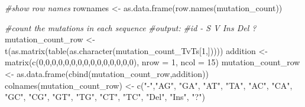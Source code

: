 \documentclass[
]{article}
\newenvironment{Shaded}{\begin{snugshade}}{\end{snugshade}}
\newcommand{\AttributeTok}[1]{\textcolor[rgb]{0.77,0.63,0.00}{#1}}
\newcommand{\CommentTok}[1]{\textcolor[rgb]{0.56,0.35,0.01}{\textit{#1}}}
\newcommand{\DecValTok}[1]{\textcolor[rgb]{0.00,0.00,0.81}{#1}}
\newcommand{\FunctionTok}[1]{\textcolor[rgb]{0.00,0.00,0.00}{#1}}
\newcommand{\NormalTok}[1]{#1}
\newcommand{\OtherTok}[1]{\textcolor[rgb]{0.56,0.35,0.01}{#1}}
\newcommand{\StringTok}[1]{\textcolor[rgb]{0.31,0.60,0.02}{#1}}
\begin{document}
\begin{Shaded}
\begin{Highlighting}[]
\CommentTok{\#show row names}
\NormalTok{rownames }\OtherTok{\textless{}{-}} \FunctionTok{as.data.frame}\NormalTok{(}\FunctionTok{row.names}\NormalTok{(mutation\_count))}

\CommentTok{\#count the mutations in each sequence}
\CommentTok{\#output: }
\CommentTok{\#id {-} S V Ins Del ?}
\NormalTok{mutation\_count\_row }\OtherTok{\textless{}{-}} \FunctionTok{t}\NormalTok{(}\FunctionTok{as.matrix}\NormalTok{(}\FunctionTok{table}\NormalTok{(}\FunctionTok{as.character}\NormalTok{(mutation\_count\_TvTs[}\DecValTok{1}\NormalTok{,]))))}
\NormalTok{addition }\OtherTok{\textless{}{-}} \FunctionTok{matrix}\NormalTok{(}\FunctionTok{c}\NormalTok{(}\DecValTok{0}\NormalTok{,}\DecValTok{0}\NormalTok{,}\DecValTok{0}\NormalTok{,}\DecValTok{0}\NormalTok{,}\DecValTok{0}\NormalTok{,}\DecValTok{0}\NormalTok{,}\DecValTok{0}\NormalTok{,}\DecValTok{0}\NormalTok{,}\DecValTok{0}\NormalTok{,}\DecValTok{0}\NormalTok{,}\DecValTok{0}\NormalTok{,}\DecValTok{0}\NormalTok{,}\DecValTok{0}\NormalTok{,}\DecValTok{0}\NormalTok{,}\DecValTok{0}\NormalTok{), }\AttributeTok{nrow =} \DecValTok{1}\NormalTok{, }\AttributeTok{ncol =} \DecValTok{15}\NormalTok{)}
\NormalTok{mutation\_count\_row }\OtherTok{\textless{}{-}} \FunctionTok{as.data.frame}\NormalTok{(}\FunctionTok{cbind}\NormalTok{(mutation\_count\_row,addition))}
\FunctionTok{colnames}\NormalTok{(mutation\_count\_row) }\OtherTok{\textless{}{-}} \FunctionTok{c}\NormalTok{(}\StringTok{"{-}"}\NormalTok{,}\StringTok{"AG"}\NormalTok{, }\StringTok{"GA"}\NormalTok{, }\StringTok{"AT"}\NormalTok{, }\StringTok{"TA"}\NormalTok{, }\StringTok{"AC"}\NormalTok{, }\StringTok{"CA"}\NormalTok{, }\StringTok{"GC"}\NormalTok{, }\StringTok{"CG"}\NormalTok{, }\StringTok{"GT"}\NormalTok{, }\StringTok{"TG"}\NormalTok{, }\StringTok{"CT"}\NormalTok{, }\StringTok{"TC"}\NormalTok{, }\StringTok{"Del"}\NormalTok{, }\StringTok{"Ins"}\NormalTok{, }\StringTok{"?"}\NormalTok{)}


\end{Highlighting}
\end{Shaded}
\end{document}
